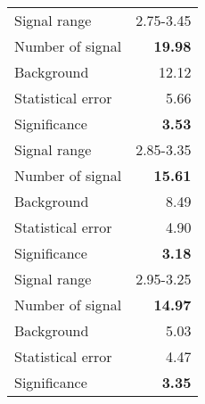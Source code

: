  {\large{
 \begin{tabular}{||l r||}
 \hline
 \hline
Signal range &      2.75-3.45 \\
Number of signal &  \textbf{  19.98} \\
Background &          12.12 \\
Statistical error &    5.66 \\
Significance &      \textbf{   3.53} \\
 \hline
Signal range &      2.85-3.35 \\
Number of signal &  \textbf{  15.61} \\
Background &           8.49 \\
Statistical error &    4.90 \\
Significance &      \textbf{   3.18} \\
 \hline
Signal range &      2.95-3.25 \\
Number of signal &  \textbf{  14.97} \\
Background &           5.03 \\
Statistical error &    4.47 \\
Significance &      \textbf{   3.35} \\
 \hline
 \hline
 \end{tabular}
 }}
 \endinput
